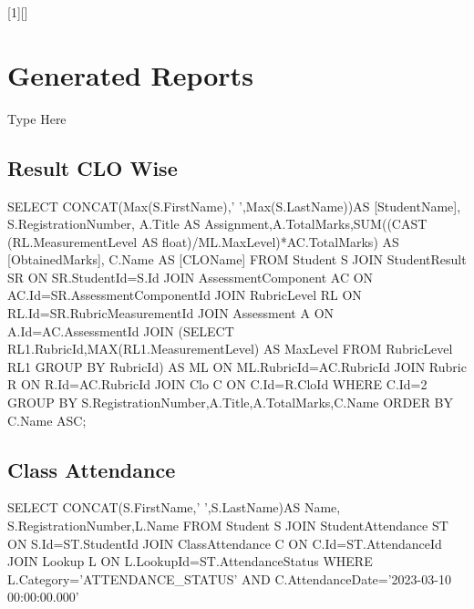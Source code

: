 \documentclass[12pt,a4paper]{article}
\begin{document}
[1][]
{\lstset{language=SQL,basicstyle=\ttfamily,#1,xleftmargin=0.5cm,xrightmargin=0.5cm}}{}

\section{Generated Reports}
Type Here
\subsection{Result CLO Wise}
\begin{sql}[style=sqlStyle]
SELECT CONCAT(Max(S.FirstName),' ',Max(S.LastName))AS [StudentName],
S.RegistrationNumber,
A.Title AS Assignment,A.TotalMarks,SUM((CAST (RL.MeasurementLevel
 AS float)/ML.MaxLevel)*AC.TotalMarks) AS [ObtainedMarks],
C.Name AS [CLOName]
FROM Student S
JOIN StudentResult SR
ON SR.StudentId=S.Id
JOIN AssessmentComponent AC
ON AC.Id=SR.AssessmentComponentId
JOIN RubricLevel RL
ON RL.Id=SR.RubricMeasurementId
JOIN  Assessment A
ON A.Id=AC.AssessmentId
JOIN (SELECT RL1.RubricId,MAX(RL1.MeasurementLevel) AS MaxLevel 
FROM RubricLevel RL1 GROUP BY RubricId) AS ML
ON ML.RubricId=AC.RubricId
JOIN Rubric R
ON R.Id=AC.RubricId
JOIN Clo C
ON C.Id=R.CloId
WHERE C.Id=2
GROUP BY S.RegistrationNumber,A.Title,A.TotalMarks,C.Name
ORDER BY C.Name ASC;
\end{sql}

\subsection{Class Attendance}
\begin{sql}[style=sqlStyle]
SELECT CONCAT(S.FirstName,' ',S.LastName)AS Name,
S.RegistrationNumber,L.Name
FROM Student S
JOIN StudentAttendance ST
ON S.Id=ST.StudentId
JOIN ClassAttendance C
ON C.Id=ST.AttendanceId
JOIN Lookup L
ON L.LookupId=ST.AttendanceStatus
WHERE L.Category='ATTENDANCE_STATUS'
 AND C.AttendanceDate='2023-03-10 00:00:00.000'
\end{sql}
\end{document}
